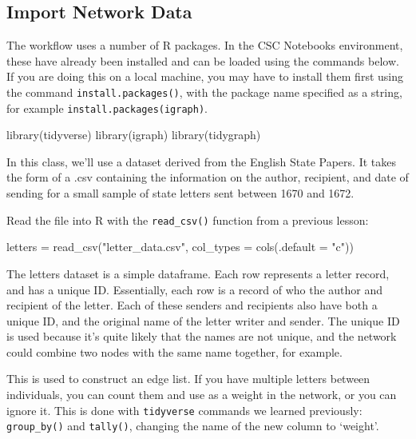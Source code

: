 \documentclass[
]{book}
\newenvironment{Shaded}{\begin{snugshade}}{\end{snugshade}}
\newcommand{\AttributeTok}[1]{\textcolor[rgb]{0.77,0.63,0.00}{#1}}
\newcommand{\FunctionTok}[1]{\textcolor[rgb]{0.00,0.00,0.00}{#1}}
\newcommand{\NormalTok}[1]{#1}
\newcommand{\OtherTok}[1]{\textcolor[rgb]{0.56,0.35,0.01}{#1}}
\newcommand{\StringTok}[1]{\textcolor[rgb]{0.31,0.60,0.02}{#1}}
\begin{document}
\hypertarget{import-network-data}{%
\subsection{Import Network Data}\label{import-network-data}}

The workflow uses a number of R packages. In the CSC Notebooks environment, these have already been installed and can be loaded using the commands below. If you are doing this on a local machine, you may have to install them first using the command \texttt{install.packages()}, with the package name specified as a string, for example \texttt{install.packages(\textquotesingle{}igraph\textquotesingle{})}.

\begin{Shaded}
\begin{Highlighting}[]
\FunctionTok{library}\NormalTok{(tidyverse)}
\FunctionTok{library}\NormalTok{(igraph)}
\FunctionTok{library}\NormalTok{(tidygraph)}
\end{Highlighting}
\end{Shaded}

In this class, we'll use a dataset derived from the English State Papers. It takes the form of a .csv containing the information on the author, recipient, and date of sending for a small sample of state letters sent between 1670 and 1672.

Read the file into R with the \texttt{read\_csv()} function from a previous lesson:

\begin{Shaded}
\begin{Highlighting}[]
\NormalTok{letters }\OtherTok{=} \FunctionTok{read\_csv}\NormalTok{(}\StringTok{"letter\_data.csv"}\NormalTok{, }\AttributeTok{col\_types =} \FunctionTok{cols}\NormalTok{(}\AttributeTok{.default =} \StringTok{"c"}\NormalTok{))}
\end{Highlighting}
\end{Shaded}

The letters dataset is a simple dataframe. Each row represents a letter record, and has a unique ID. Essentially, each row is a record of who the author and recipient of the letter. Each of these senders and recipients also have both a unique ID, and the original name of the letter writer and sender. The unique ID is used because it's quite likely that the names are not unique, and the network could combine two nodes with the same name together, for example.

This is used to construct an edge list. If you have multiple letters between individuals, you can count them and use as a weight in the network, or you can ignore it. This is done with \texttt{tidyverse} commands we learned previously: \texttt{group\_by()} and \texttt{tally()}, changing the name of the new column to `weight'.
\end{document}
